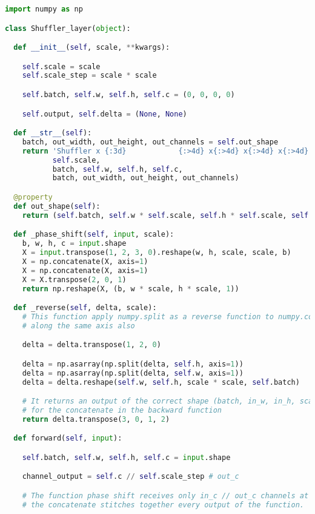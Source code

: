 \documentclass{standalone}
\begin{document}
\lstset{style=snippet}
\begin{lstlisting}[language=Python, caption=NumPyNet version of Pixel-Shuffle function, label=code:py_shuffle]
import numpy as np

class Shuffler_layer(object):

  def __init__(self, scale, **kwargs):

    self.scale = scale
    self.scale_step = scale * scale

    self.batch, self.w, self.h, self.c = (0, 0, 0, 0)

    self.output, self.delta = (None, None)

  def __str__(self):
    batch, out_width, out_height, out_channels = self.out_shape
    return 'Shuffler x {:3d}            {:>4d} x{:>4d} x{:>4d} x{:>4d}   ->  {:>4d} x{:>4d} x{:>4d} x{:>4d}'.format(
           self.scale,
           batch, self.w, self.h, self.c,
           batch, out_width, out_height, out_channels)

  @property
  def out_shape(self):
    return (self.batch, self.w * self.scale, self.h * self.scale, self.c // (self.scale_step))

  def _phase_shift(self, input, scale):
    b, w, h, c = input.shape
    X = input.transpose(1, 2, 3, 0).reshape(w, h, scale, scale, b)
    X = np.concatenate(X, axis=1)
    X = np.concatenate(X, axis=1)
    X = X.transpose(2, 0, 1)
    return np.reshape(X, (b, w * scale, h * scale, 1))

  def _reverse(self, delta, scale):
    # This function apply numpy.split as a reverse function to numpy.concatenate
    # along the same axis also

    delta = delta.transpose(1, 2, 0)

    delta = np.asarray(np.split(delta, self.h, axis=1))
    delta = np.asarray(np.split(delta, self.w, axis=1))
    delta = delta.reshape(self.w, self.h, scale * scale, self.batch)

    # It returns an output of the correct shape (batch, in_w, in_h, scale**2)
    # for the concatenate in the backward function
    return delta.transpose(3, 0, 1, 2)

  def forward(self, input):

    self.batch, self.w, self.h, self.c = input.shape

    channel_output = self.c // self.scale_step # out_c

    # The function phase shift receives only in_c // out_c channels at a time
    # the concatenate stitches together every output of the function.


\end{lstlisting}
\end{document}
